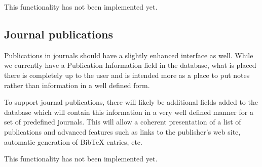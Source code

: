 \documentclass[12pt]{article}
\begin{document}
This functionality has not been implemented yet.

\subsection{Journal publications}

Publications in journals should have a slightly enhanced interface as well.
While we currently have a Publication Information field in the database, what is
placed there is completely up to the user and is intended more as a place to put
notes rather than information in a well defined form. 

To support journal publications, there will likely be additional fields added to
the database which will contain this information in a very well defined manner
for a set of predefined journals. This will allow a coherent presentation of a
list of publications and advanced features such as links to the publisher's web
site, automatic generation of BibTeX entries, etc.

This functionality has not been implemented yet.


                                                                                      
\end{document}
